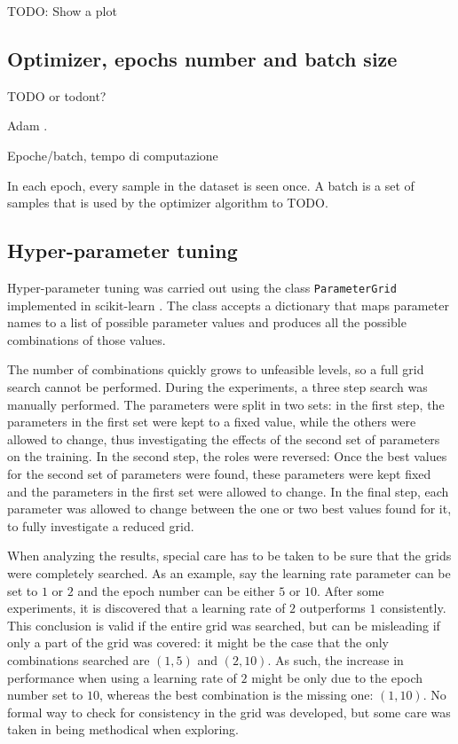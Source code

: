 TODO: Show a plot

\subsection{Optimizer, epochs number and batch size}
TODO or todont?

Adam \cite{kingma2017adam}.

Epoche/batch, tempo di computazione

In each epoch, every sample in the dataset is seen once.
A batch is a set of samples that is used by the optimizer 
algorithm to TODO.

\subsection{Hyper-parameter tuning}

Hyper-parameter tuning was carried out using the class \texttt{ParameterGrid}
implemented in scikit-learn \cite{scikit-learn}.
The class accepts a dictionary that maps parameter names to a list of possible
parameter values and produces all the possible combinations of those values.

The number of combinations quickly grows to unfeasible levels, so a full grid
search cannot be performed.
During the experiments, a three step search was manually performed.
The parameters were split in two sets:
in the first step, the parameters in the first set were kept to a fixed value,
while the others were allowed to change, thus investigating the effects of the
second set of parameters on the training.
In the second step, the roles were reversed:
Once the best values for the second set of parameters were found, these
parameters were kept fixed and the parameters in the first set were allowed to
change.
In the final step, each parameter was allowed to change between the one or two
best values found for it, to fully investigate a reduced grid.

When analyzing the results, special care has to be taken to be sure that
the grids were completely searched.
As an example, say the learning rate parameter can be set to $1$ or $2$
and the epoch number can be either $5$ or $10$.
After some experiments, it is discovered that a learning rate of $2$
outperforms $1$ consistently.
This conclusion is valid if the entire grid was searched, but can be misleading
if only a part of the grid was covered: it might be the case that the only
combinations searched are $(1, 5)$ and $(2, 10)$.
As such, the increase in performance when using a learning rate of $2$ might be
only due to the epoch number set to $10$, whereas the best combination is the
missing one: $(1, 10)$.
No formal way to check for consistency in the grid was developed,
but some care was taken in being methodical when exploring.

